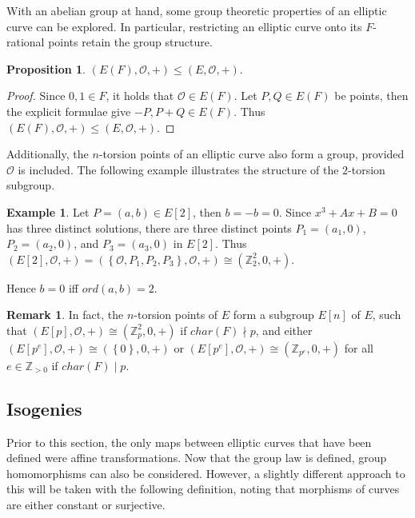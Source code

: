 \documentclass{article}
\newcommand{\Z}{\mathbb{Z}}
\newcommand{\rb}[1]{\left( #1 \right)}
\renewcommand{\sb}[1]{\left[ #1 \right]}
\newcommand{\cb}[1]{\left\{ #1 \right\}}
\theoremstyle{definition}
\newtheorem*{example}{Example}
\newtheorem*{remark}{Remark}
\newtheorem{proposition}{Proposition}[subsection]
\begin{document}
With an abelian group at hand, some group theoretic properties of an elliptic curve can be explored. In particular, restricting an elliptic curve onto its $ F $-rational points retain the group structure.

\begin{proposition}
$ \rb{E\rb{F}, \mathcal{O}, +} \le \rb{E, \mathcal{O}, +} $.
\end{proposition}

\begin{proof}
Since $ 0, 1 \in F $, it holds that $ \mathcal{O} \in E\rb{F} $. Let $ P, Q \in E\rb{F} $ be points, then the explicit formulae give $ -P, P + Q \in E\rb{F} $. Thus $ \rb{E\rb{F}, \mathcal{O}, +} \le \rb{E, \mathcal{O}, +} $.
\end{proof}

Additionally, the $ n $-torsion points of an elliptic curve also form a group, provided $ \mathcal{O} $ is included. The following example illustrates the structure of the $ 2 $-torsion subgroup.

\begin{example}
Let $ P = \rb{a, b} \in E\sb{2} $, then $ b = -b = 0 $. Since $ x^3 + Ax + B = 0 $ has three distinct solutions, there are three distinct points $ P_1 = \rb{a_1, 0} $, $ P_2 = \rb{a_2, 0} $, and $ P_3 = \rb{a_3, 0} $ in $ E\sb{2} $. Thus $ \rb{E\sb{2}, \mathcal{O}, +} = \rb{\cb{\mathcal{O}, P_1, P_2, P_3}, \mathcal{O}, +} \cong \rb{\Z_2^2, 0, +} $.
\end{example}

Hence $ b = 0 $ iff $ ord\rb{a, b} = 2 $.

\begin{remark}
In fact, the $ n $-torsion points of $ E $ form a subgroup $ E\sb{n} $ of $ E $, such that $ \rb{E\sb{p}, \mathcal{O}, +} \cong \rb{\Z_p^2, 0, +} $ if $ char\rb{F} \nmid p $, and either $ \rb{E\sb{p^e}, \mathcal{O}, +} \cong \rb{\cb{0}, 0, +} $ or $ \rb{E\sb{p^e}, \mathcal{O}, +} \cong \rb{\Z_{p^e}, 0, +} $ for all $ e \in \Z_{> 0} $ if $ char\rb{F} \mid p $.
\end{remark}

\pagebreak

\subsection{Isogenies}

Prior to this section, the only maps between elliptic curves that have been defined were affine transformations. Now that the group law is defined, group homomorphisms can also be considered. However, a slightly different approach to this will be taken with the following definition, noting that morphisms of curves are either constant or surjective.
\end{document}

